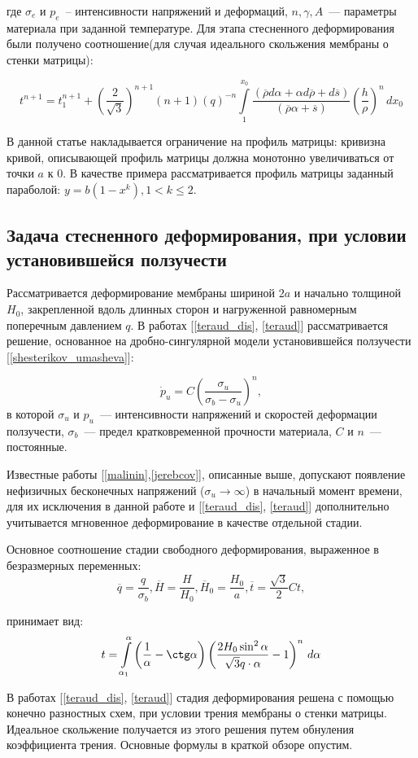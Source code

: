 где $\sigma_e$ и $p_e$~-- интенсивности напряжений и деформаций, $n, \gamma, A$~--- параметры материала при заданной температуре.
Для этапа стесненного деформирования были получено соотношение(для случая идеального скольжения мембраны о стенки матрицы): 

\begin{equation}
t^{n+1} = t_1^{n+1}+\left(\dfrac{2}{\sqrt 3}\right)^{n+1}(n+1)(q)^{-n}\int\limits_1^{x_0}\dfrac{(\overline{\rho} d\alpha + \alpha 
   d\overline{\rho}+d\overline{s})}{(\overline{\rho} \alpha + \overline{s})}\left(\dfrac{h}{\rho}\right)^n\, dx_0
\end{equation}

В данной статье накладывается ограничение на профиль матрицы: кривизна кривой, описывающей профиль
матрицы должна монотонно увеличиваться от точки $a$ к $0$.
 В качестве примера рассматривается профиль матрицы заданный параболой: $y= b(1-x^k), 1<k\leqslant 2$. 

\subsection{Задача стесненного деформирования, при условии установившейся ползучести}
Рассматривается деформирование мембраны шириной $2a$ и начально толщиной $H_0$, закрепленной вдоль длинных сторон и нагруженной равномерным поперечным давлением $q$.
В работах [\ref{teraud_dis}, \ref{teraud}] рассматривается решение, основанное на дробно-сингулярной модели установившейся ползучести [\ref{shesterikov_umasheva}]:

 \begin{equation}
  \dot{p}_u = C \left( \frac{\sigma_u}{\sigma_b - \sigma_u} \right)^n, 
 \end{equation}
в которой $\sigma_u$ и $\textit{\.{p}}_u$~--- интенсивности напряжений и скоростей деформации ползучести, $\sigma_b$~--- предел кратковременной прочности материала, $C$ и $n$~--- постоянные.


 Известные работы [\ref{malinin},\ref{jerebcov}], описанные выше, допускают появление нефизичных бесконечных напряжений ($\sigma_u \to \infty$) в начальный момент времени, для их исключения в данной работе и [\ref{teraud_dis}, \ref{teraud}] дополнительно учитывается мгновенное деформирование в качестве отдельной стадии.
 
 Основное соотношение стадии свободного деформирования, выраженное в безразмерных переменных:
 \begin{equation}
	\overline{q} = \dfrac{q}{\sigma_b}, \overline{H} = \dfrac{H}{H_0}, \overline{H}_0 = \dfrac{H_0}{a}, \overline{t} = \dfrac{\sqrt 3}{2}Ct, 
 \end{equation}   

принимает вид:
\begin{equation}
t=\int\limits_{\alpha_1}^{\alpha}\left(\dfrac{1}{\alpha}-\ctg \alpha\right)\left(\dfrac{2H_0\sin^2\alpha}{\sqrt 3 q \cdot \alpha}-1\right)^n \, d\alpha
\end{equation}   

В работах [\ref{teraud_dis}, \ref{teraud}] стадия деформирования решена с помощью конечно разностных схем, при условии трения 
мембраны о стенки матрицы. Идеальное скольжение получается из этого решения путем обнуления коэффициента трения.
Основные формулы в краткой обзоре опустим.
